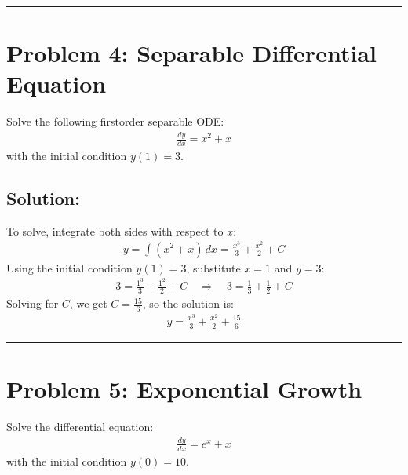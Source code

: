 \documentclass[letterpaper,10pt,english]{jupyterBook}
\begin{document}
\bigskip\hrule\bigskip



\section{Problem 4: Separable Differential Equation}
\label{\detokenize{prerequisites:problem-4-separable-differential-equation}}
\sphinxAtStartPar
Solve the following first\sphinxhyphen{}order separable ODE:
\begin{equation*}
\begin{split}
\frac{dy}{dx} = x^2 + x
\end{split}
\end{equation*}
\sphinxAtStartPar
with the initial condition \(y(1) = 3\).


\subsection{Solution:}
\label{\detokenize{prerequisites:id5}}
\sphinxAtStartPar
To solve, integrate both sides with respect to \(x\):
\begin{equation*}
\begin{split}
y = \int (x^2 + x) \, dx = \frac{x^3}{3} + \frac{x^2}{2} + C
\end{split}
\end{equation*}
\sphinxAtStartPar
Using the initial condition \(y(1) = 3\), substitute \(x = 1\) and \(y = 3\):
\begin{equation*}
\begin{split}
3 = \frac{1^3}{3} + \frac{1^2}{2} + C \quad \Rightarrow \quad 3 = \frac{1}{3} + \frac{1}{2} + C
\end{split}
\end{equation*}
\sphinxAtStartPar
Solving for \(C\), we get \(C = \frac{15}{6}\), so the solution is:
\begin{equation*}
\begin{split}
y = \frac{x^3}{3} + \frac{x^2}{2} + \frac{15}{6}
\end{split}
\end{equation*}

\bigskip\hrule\bigskip



\section{Problem 5: Exponential Growth}
\label{\detokenize{prerequisites:problem-5-exponential-growth}}
\sphinxAtStartPar
Solve the differential equation:
\begin{equation*}
\begin{split}
\frac{dy}{dx} = e^x + x
\end{split}
\end{equation*}
\sphinxAtStartPar
with the initial condition \(y(0) = 10\).
\end{document}
